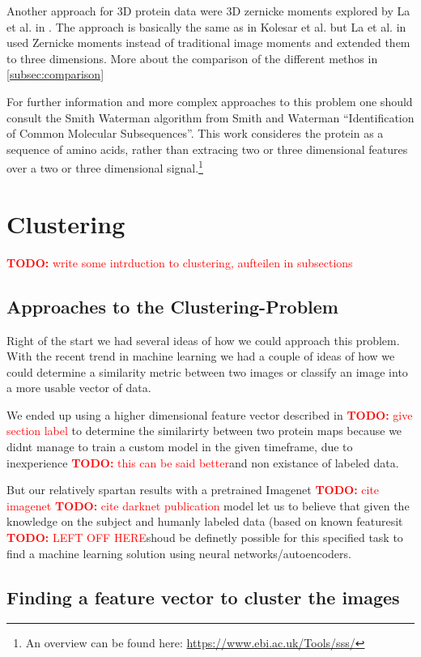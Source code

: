 \documentclass[journal]{vgtc}       %
\newcommand{\todo}[1]{\textcolor{red}{\textbf{TODO:} #1}}
\begin{document}
Another approach for 3D protein data were 3D zernicke moments explored by La et al. in \cite{3dsurfer}. The approach is basically the same as in Kolesar et al. but La et al.  in \cite{3dsurfer} used Zernicke moments instead of traditional image moments and extended them to three dimensions. More about the comparison of the different methos in \ref{subsec:comparison}

For further information and more complex approaches to this problem one should consult the Smith Waterman algorithm from Smith and Waterman ``Identification of Common Molecular Subsequences''\cite{smithwater}. This work consideres the protein as a sequence of amino acids, rather than extracing two or three dimensional features over a two or three dimensional signal.\footnote{An overview can be found here: \url{https://www.ebi.ac.uk/Tools/sss/}}


\section{Clustering}
\todo{write some intrduction to clustering, aufteilen in subsections}
\subsection{Approaches to the Clustering-Problem}

Right of the start we had several ideas of how we could approach this problem. 
With the recent trend in machine learning we had a couple of ideas of how we could determine a similarity metric between two images or classify an image into a more usable vector of data.

We ended up using a higher dimensional feature vector described in \todo{give section label} to determine the similarirty between two protein maps because we didnt manage to train a custom model in the given timeframe, due to inexperience \todo{this can be said better}and non existance of labeled data.

But our relatively spartan results with a pretrained Imagenet \todo{cite imagenet} \cite{imagenet} \todo{cite darknet publication}  model let us to believe that given the knowledge on the subject and humanly labeled data (based on known featuresit \todo{LEFT OFF HERE}shoud be definetly possible for this specified task to find a machine learning  solution using neural networks/autoencoders.



\subsection{Finding a feature vector to cluster the images}
\end{document}
